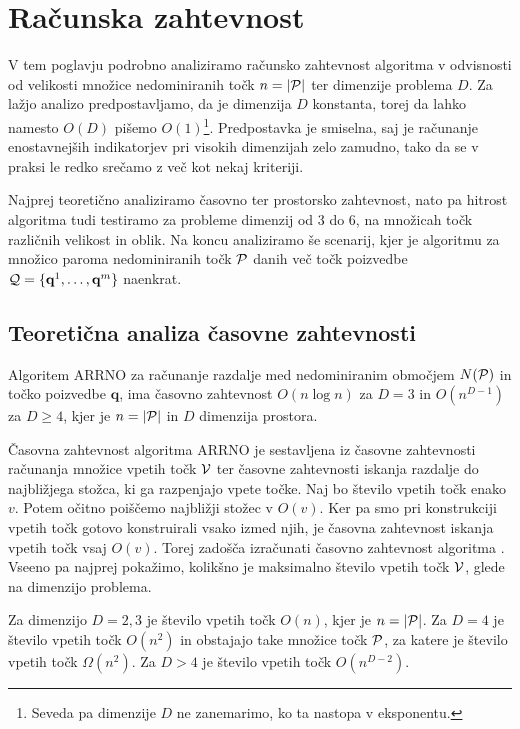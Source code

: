 \section{Računska zahtevnost}
\label{sec:racunska_zahtevnost}
V tem poglavju podrobno analiziramo računsko zahtevnost algoritma v odvisnosti od velikosti množice nedominiranih točk $n = |\P|$ ter dimenzije problema $D$. Za lažjo analizo predpostavljamo, da je dimenzija $D$ konstanta, torej da lahko namesto $O(D)$ pišemo $O(1)$\footnote{Seveda pa dimenzije $D$ ne zanemarimo, ko ta nastopa v eksponentu.}. Predpostavka je smiselna, saj je računanje enostavnejših indikatorjev pri visokih dimenzijah zelo zamudno, tako da se v praksi le redko srečamo z več kot nekaj kriteriji. 

Najprej teoretično analiziramo časovno ter prostorsko zahtevnost, nato pa hitrost algoritma tudi testiramo za probleme dimenzij od 3 do 6, na množicah točk različnih velikost in oblik. Na koncu analiziramo še scenarij, kjer je algoritmu za množico paroma nedominiranih točk $\P$ danih več točk poizvedbe $\Q = \{\textbf{q}^1, \dots, \textbf{q}^m \}$ naenkrat. 

\subsection{Teoretična analiza časovne zahtevnosti}
\begin{izrek}
Algoritem ARRNO za računanje razdalje med nedominiranim območjem $N(\P)$ in točko poizvedbe $\textbf{q}$, ima časovno zahtevnost $O(n \log n)$ za $D=3$ in $O(n^{D-1})$ za $D \geq 4$, kjer je $n = |\P|$ in $D$ dimenzija prostora.
\end{izrek}
Časovna zahtevnost algoritma ARRNO je sestavljena iz časovne zahtevnosti računanja množice vpetih točk $\V$ ter časovne zahtevnosti iskanja razdalje do najbližjega stožca, ki ga razpenjajo vpete točke. Naj bo število vpetih točk enako $v$. Potem očitno poiščemo najbližji stožec v $O(v)$. Ker pa smo pri konstrukciji vpetih točk gotovo konstruirali vsako izmed njih, je časovna zahtevnost iskanja vpetih točk vsaj $O(v)$. Torej zadošča izračunati časovno zahtevnost algoritma . Vseeno pa najprej pokažimo, kolikšno je maksimalno število vpetih točk $\V$, glede na dimenzijo problema. 

\begin{trditev}
\label{sec:st_vpetih_tock}
Za dimenzijo $D=2, 3$ je število vpetih točk $O(n)$, kjer je $n = |\P|$. Za $D=4$ je število vpetih točk $O(n^2)$ in obstajajo take množice točk $\P$, za katere je število vpetih točk $\Omega(n^2)$. Za $D > 4$ je število vpetih točk $O(n^{D-2})$.
\end{trditev}

